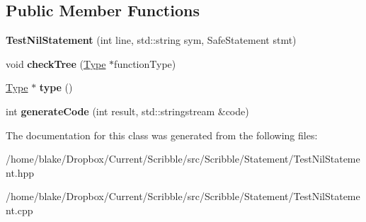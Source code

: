 \subsection*{Public Member Functions}
\begin{DoxyCompactItemize}
\item 
\hypertarget{class_scribble_core_1_1_test_nil_statement_aab1bb6fcbd922fcbf1649a8b2b149609}{{\bfseries Test\-Nil\-Statement} (int line, std\-::string sym, Safe\-Statement stmt)}\label{class_scribble_core_1_1_test_nil_statement_aab1bb6fcbd922fcbf1649a8b2b149609}

\item 
\hypertarget{class_scribble_core_1_1_test_nil_statement_a5753286b02663fc295562cc1256188a6}{void {\bfseries check\-Tree} (\hyperlink{class_scribble_core_1_1_type}{Type} $\ast$function\-Type)}\label{class_scribble_core_1_1_test_nil_statement_a5753286b02663fc295562cc1256188a6}

\item 
\hypertarget{class_scribble_core_1_1_test_nil_statement_a684f59158a70ad261fa2ec56832a3c03}{\hyperlink{class_scribble_core_1_1_type}{Type} $\ast$ {\bfseries type} ()}\label{class_scribble_core_1_1_test_nil_statement_a684f59158a70ad261fa2ec56832a3c03}

\item 
\hypertarget{class_scribble_core_1_1_test_nil_statement_af2e0759b43380902103e029f4eaa8955}{int {\bfseries generate\-Code} (int result, std\-::stringstream \&code)}\label{class_scribble_core_1_1_test_nil_statement_af2e0759b43380902103e029f4eaa8955}

\end{DoxyCompactItemize}


The documentation for this class was generated from the following files\-:\begin{DoxyCompactItemize}
\item 
/home/blake/\-Dropbox/\-Current/\-Scribble/src/\-Scribble/\-Statement/Test\-Nil\-Statement.\-hpp\item 
/home/blake/\-Dropbox/\-Current/\-Scribble/src/\-Scribble/\-Statement/Test\-Nil\-Statement.\-cpp\end{DoxyCompactItemize}
